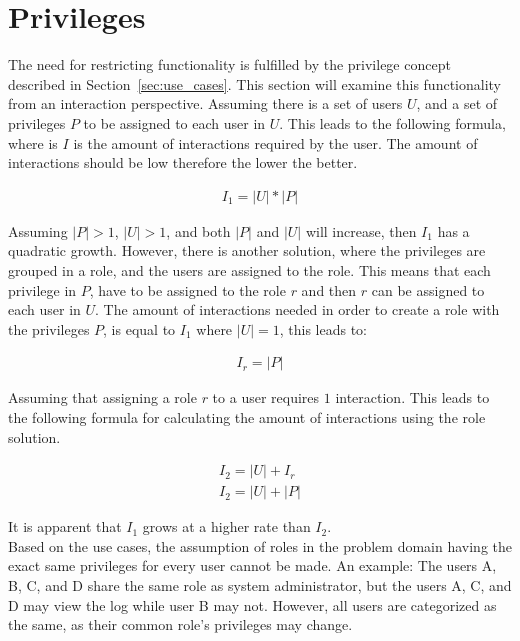 \section{Privileges}
The need for restricting functionality is fulfilled by the privilege concept described in Section~\ref{sec:use_cases}. This section will examine this functionality from an interaction perspective. Assuming there is a set of users $U$, and a set of privileges $P$ to be assigned to each user in $U$. This leads to the following formula, where is $I$ is the amount of interactions required by the user. The amount of interactions should be low therefore the lower the better.

\begin{align}
I_1 = |U|*|P|
\end{align}

Assuming $|P| > 1$, $|U| > 1$, and both $|P|$ and $|U|$ will increase, then $I_1$ has a quadratic growth. However, there is another solution, where the privileges are grouped in a role, and the users are assigned to the role. This means that each privilege in $P$, have to be assigned to the role $r$ and then $r$ can be assigned to each user in $U$. The amount of interactions needed in order to create a role with the privileges $P$, is equal to $I_1$ where $|U| = 1$, this leads to:

\begin{align}
I_r = |P|
\end{align}

Assuming that assigning a role $r$ to a user requires $1$ interaction. This leads to the following formula for calculating the amount of interactions using the role solution.

\begin{align}
I_2 = |U|+I_r \\
I_2 = |U|+|P|
\end{align}

It is apparent that $I_1$ grows at a higher rate than $I_2$. \\

Based on the use cases, the assumption of roles in the problem domain having the exact same privileges for every user cannot be made. An example: The users A, B, C, and D share the same role as system administrator, but the users A, C, and D may view the log while user B may not. However, all users are categorized as the same, as their common role's privileges may change. \\

